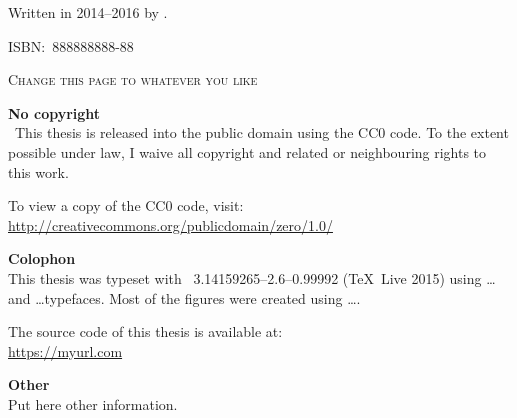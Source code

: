 \thispagestyle{empty}

\null%
\vfill
Written in 2014--2016 by
{\makeatletter
\href{http://mywebsite.com}{\@author}%
\makeatother}.

\textsc{ISBN:}\ 888888888-88

\textsc{Change this page to whatever you like}

\textbf{No copyright}\\
\cczero\ This thesis is released into the public domain using the CC0 code.
To the extent possible under law, I waive all copyright and related or neighbouring rights to this work.

To view a copy of the CC0 code, visit: \\
\url{http://creativecommons.org/publicdomain/zero/1.0/}

\textbf{Colophon} \\
This thesis was typeset with \XeTeX\ 3.14159265--2.6--0.99992 (\TeX\ 
Live 2015) using \ldots and \ldots typefaces.
Most of the figures were created using \ldots.

The source code of this thesis is available at: \\
\url{https://myurl.com}

\textbf{Other} \\
Put here other information.
